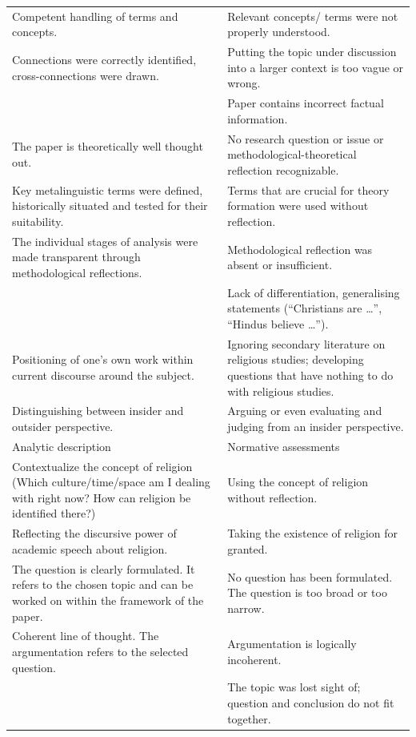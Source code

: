 \documentclass[
  english,
]{scrreprt}
\begin{document}
\begin{longtable}[]{@{}
  >{\raggedright\arraybackslash}p{}
  >{\raggedright\arraybackslash}p{}@{}}
Competent handling of terms and concepts. & Relevant concepts/ terms were not properly understood. \\
Connections were correctly identified, cross-connections were drawn. & Putting the topic under discussion into a larger context is too vague or wrong. \\
& Paper contains incorrect factual information. \\
The paper is theoretically well thought out. & No research question or issue or methodological-theoretical reflection recognizable. \\
Key metalinguistic terms were defined, historically situated and tested for their suitability. & Terms that are crucial for theory formation were used without reflection. \\
The individual stages of analysis were made transparent through methodological reflections. & Methodological reflection was absent or insufficient. \\
& Lack of differentiation, generalising statements (“Christians are …”, “Hindus believe …”). \\
Positioning of one’s own work within current discourse around the subject. & Ignoring secondary literature on religious studies; developing questions that have nothing to do with religious studies. \\
Distinguishing between insider and outsider perspective. & Arguing or even evaluating and judging from an insider perspective. \\
Analytic description & Normative assessments \\
Contextualize the concept of religion (Which culture/\hspace{0pt}time/\hspace{0pt}space am I dealing with right now? How can religion be identified there?) & Using the concept of religion without reflection. \\
Reflecting the discursive power of academic speech about religion. & Taking the existence of religion for granted. \\
The question is clearly formulated. It refers to the chosen topic and can be worked on within the framework of the paper. & No question has been formulated. The question is too broad or too narrow. \\
Coherent line of thought. The argumentation refers to the selected question. & Argumentation is logically incoherent. \\
& The topic was lost sight of; question and conclusion do not fit together. \\

\end{longtable}
\end{document}
